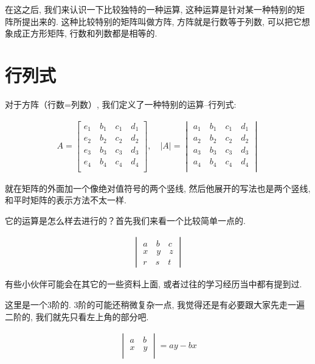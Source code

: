 在这之后, 我们来认识一下比较独特的一种运算, 这种运算是针对某一种特别的矩阵所提出来的. 这种比较特别的矩阵叫做方阵, 方阵就是行数等于列数, 可以把它想象成正方形矩阵, 行数和列数都是相等的. 

\section{行列式}

对于方阵（行数=列数）, 我们定义了一种特别的运算--行列式: 

\begin{align*}
  A = 
  \begin{bmatrix}
  e_1 \quad b_1 \quad c_1 \quad  d_1\\
  e_2 \quad b_2 \quad c_2 \quad  d_2\\ 
  e_3 \quad b_3 \quad c_3 \quad  d_3\\
  e_4 \quad b_4 \quad c_4 \quad  d_4\\
  \end{bmatrix}, \quad
  |A| = 
  \begin{vmatrix}
  a_1 \quad b_1 \quad c_1 \quad d_1\\
  a_2 \quad b_2 \quad c_2 \quad d_2\\
  a_3 \quad b_3 \quad c_3 \quad d_3\\
  a_4 \quad b_4 \quad c_4 \quad d_4\\
  \end{vmatrix}
\end{align*}

就在矩阵的外面加一个像绝对值符号的两个竖线, 然后他展开的写法也是两个竖线, 和平时矩阵的表示方法不太一样. 

它的运算是怎么样去进行的？首先我们来看一个比较简单一点的. 

\begin{align*}
  \begin{vmatrix}
  a \quad b \quad c \\
  x \quad y \quad z \\
  r \quad s \quad t
  \end{vmatrix}
\end{align*}

有些小伙伴可能会在其它的一些资料上面, 或者过往的学习经历当中都有提到过. 

这里是一个3阶的. 3阶的可能还稍微复杂一点, 我觉得还是有必要跟大家先走一遍二阶的, 我们就先只看左上角的部分吧. 

\begin{align*}
  \begin{vmatrix}
  a \quad b  \\
  x \quad y  \\
  \end{vmatrix}
  =
  ay - bx
\end{align*}

